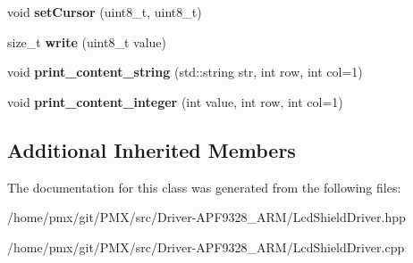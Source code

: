 \begin{DoxyCompactItemize}
void {\bfseries set\+Cursor} (uint8\+\_\+t, uint8\+\_\+t)
\item 
\mbox{\label{classLcdShieldDriver_aea03f93f7dfad9bc185bd77ef059c665}} 
size\+\_\+t {\bfseries write} (uint8\+\_\+t value)
\item 
\mbox{\label{classLcdShieldDriver_a893f217db662b34726d0684bb014f7d4}} 
void {\bfseries print\+\_\+content\+\_\+string} (std\+::string str, int row, int col=1)
\item 
\mbox{\label{classLcdShieldDriver_ae1a249341c06d6992767e8176ef96056}} 
void {\bfseries print\+\_\+content\+\_\+integer} (int value, int row, int col=1)
\end{DoxyCompactItemize}
\subsection*{Additional Inherited Members}


The documentation for this class was generated from the following files\+:\begin{DoxyCompactItemize}
\item 
/home/pmx/git/\+P\+M\+X/src/\+Driver-\/\+A\+P\+F9328\+\_\+\+A\+R\+M/Lcd\+Shield\+Driver.\+hpp\item 
/home/pmx/git/\+P\+M\+X/src/\+Driver-\/\+A\+P\+F9328\+\_\+\+A\+R\+M/Lcd\+Shield\+Driver.\+cpp\end{DoxyCompactItemize}
